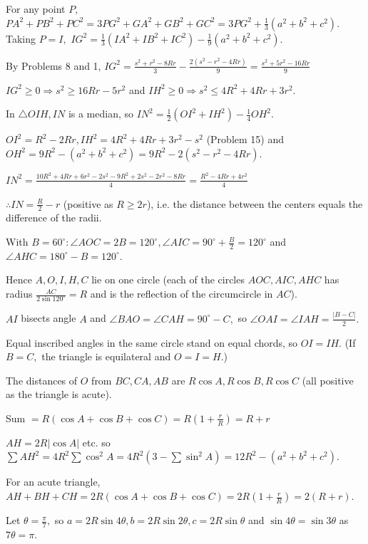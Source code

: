   For any point $P,$ $PA^2 + PB^2 + PC^2 = 3PG^2 + GA^2 + GB^2 + GC^2 = 3PG^2 + \frac{1}{3}(a^2 + b^2 + c^2).$ Taking $P = I,$
  $IG^2 = \frac{1}{3}(IA^2 + IB^2 + IC^2) - \frac{1}{9}(a^2 + b^2 + c^2).$

  By Problems 8 and 1, $IG^2 = \frac{s^2 + r^2 - 8Rr}{3} - \frac{2(s^2 - r^2 - 4Rr)}{9} = \frac{s^2 + 5r^2 - 16Rr}{9}$

  $IG^2\geq 0 \Rightarrow s^2\geq 16Rr - 5r^2$ and $IH^2\geq 0\Rightarrow s^2\leq 4R^2 + 4Rr + 3r^2.$
\item In $\triangle OIH, IN$ is a median, so $IN^2 = \frac{1}{2}(OI^2 + IH^2) - \frac{1}{4}OH^2.$

  $OI^2 = R^2 - 2Rr, IH^2 = 4R^2 + 4Rr + 3r^2 - s^2$ (Problem 15) and $OH^2 = 9R^2 - (a^2 + b^2 + c^2) = 9R^2 - 2(s^2 - r^2 -
  4Rr).$

  $IN^2 = \frac{10R^2 + 4Rr + 6r^2 - 2s^2 - 9R^2 + 2s^2 - 2r^2 - 8Rr}{4} = \frac{R^2 - 4Rr + 4r^2}{4}$

  $\therefore IN = \frac{R}{2} - r$ (positive as $R\geq 2r$), i.e. the distance between the centers equals the difference of
  the radii.
\item With $B = 60^\circ: \angle AOC = 2B = 120^\circ, \angle AIC = 90^\circ + \frac{B}{2} = 120^\circ$ and $\angle AHC =
  180^\circ - B = 120^\circ.$

  Hence $A, O, I, H, C$ lie on one circle (each of the circles $AOC, AIC, AHC$ has radius $\frac{AC}{2\sin 120^\circ} = R$
  and is the reflection of the circumcircle in $AC$).

  $AI$ bisects angle $A$ and $\angle BAO = \angle CAH = 90^\circ - C,$ so $\angle OAI = \angle IAH = \frac{|B - C|}{2}.$

  Equal inscribed angles in the same circle stand on equal chords, so $OI = IH.$ (If $B = C,$ the triangle is equilateral
  and $O = I = H.$)
\item The distances of $O$ from $BC, CA, AB$ are $R\cos A, R\cos B, R\cos C$ (all positive as the triangle is acute).

  Sum $= R(\cos A + \cos B + \cos C) = R\left(1 + \frac{r}{R}\right) = R + r$
\item $AH = 2R|\cos A|$ etc. so $\sum AH^2 = 4R^2\sum\cos^2A = 4R^2\left(3 - \sum\sin^2A\right) = 12R^2 - (a^2 + b^2 +
  c^2).$

  For an acute triangle, $AH + BH + CH = 2R(\cos A + \cos B + \cos C) = 2R\left(1 + \frac{r}{R}\right) = 2(R + r).$
\item Let $\theta = \frac{\pi}{7},$ so $a = 2R\sin 4\theta, b = 2R\sin 2\theta, c = 2R\sin\theta$ and $\sin 4\theta = \sin
  3\theta$ as $7\theta = \pi.$


